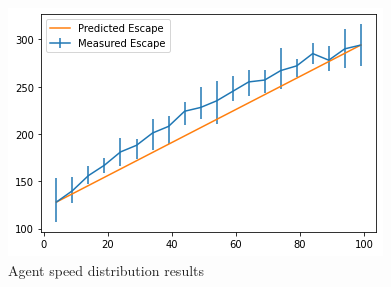 \documentclass[12pt,letterpaper]{article}
\begin{document}
\begin{figure}
  \centering
  \includegraphics[width=.75\linewidth]{./figures/speed_dist_test.png}
  \caption{Agent speed distribution results}
\end{figure}
\end{document}
